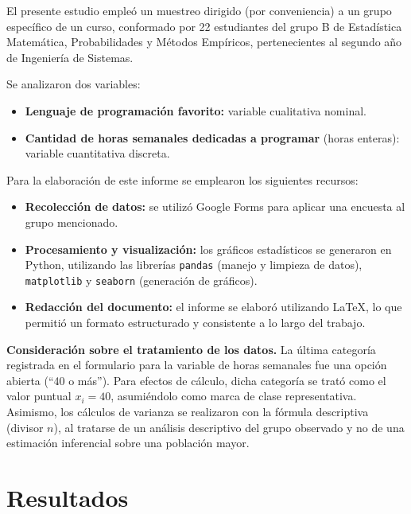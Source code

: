 \documentclass[12pt,letterpaper]{article}
\begin{document}
El presente estudio empleó un muestreo dirigido (por conveniencia) a un grupo específico de un curso, conformado por 22 estudiantes del grupo B de Estadística Matemática, Probabilidades y Métodos Empíricos, pertenecientes al segundo año de Ingeniería de Sistemas.

Se analizaron dos variables:

\begin{itemize}
    \item \textbf{Lenguaje de programación favorito:} variable cualitativa nominal.
    \item \textbf{Cantidad de horas semanales dedicadas a programar} (horas enteras): variable cuantitativa discreta.
\end{itemize}

Para la elaboración de este informe se emplearon los siguientes recursos:

\begin{itemize}
    \item \textbf{Recolección de datos:} se utilizó Google Forms para aplicar una encuesta al grupo mencionado.
    \item \textbf{Procesamiento y visualización:} los gráficos estadísticos se generaron en Python, utilizando las librerías \texttt{pandas} (manejo y limpieza de datos), \texttt{matplotlib} y \texttt{seaborn} (generación de gráficos).
    \item \textbf{Redacción del documento:} el informe se elaboró utilizando \LaTeX{}, lo que permitió un formato estructurado y consistente a lo largo del trabajo.
\end{itemize}

\noindent\textbf{Consideración sobre el tratamiento de los datos.} La última categoría registrada en el formulario para la variable de horas semanales fue una opción abierta (\enquote{40 o más}). Para efectos de cálculo, dicha categoría se trató como el valor puntual $x_i = 40$, asumiéndolo como marca de clase representativa. Asimismo, los cálculos de varianza se realizaron con la fórmula descriptiva (divisor $n$), al tratarse de un análisis descriptivo del grupo observado y no de una estimación inferencial sobre una población mayor.

\clearpage

\section{Resultados}
\end{document}
